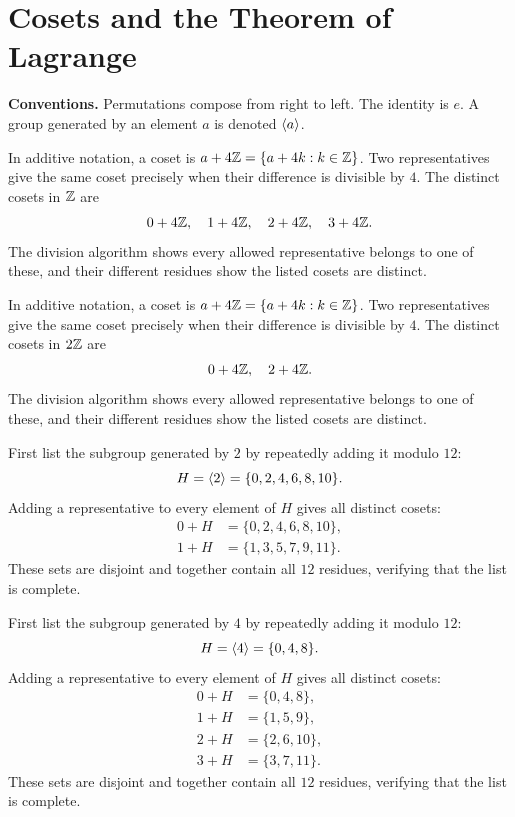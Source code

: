 \section{Cosets and the Theorem of Lagrange}
\textbf{Conventions.} Permutations compose from right to left. The identity is $e$. A group generated by an element $a$ is denoted $\langle a\rangle$.

In additive notation, a coset is $a+4\mathbb{Z}=\{a+4k:k\in\mathbb{Z}\}$. Two representatives give the same coset precisely when their difference is divisible by $4$. The distinct cosets in $\mathbb{Z}$ are\[0+4\mathbb{Z},\quad 1+4\mathbb{Z},\quad 2+4\mathbb{Z},\quad 3+4\mathbb{Z}.\]The division algorithm shows every allowed representative belongs to one of these, and their different residues show the listed cosets are distinct.

In additive notation, a coset is $a+4\mathbb{Z}=\{a+4k:k\in\mathbb{Z}\}$. Two representatives give the same coset precisely when their difference is divisible by $4$. The distinct cosets in $2\mathbb{Z}$ are\[0+4\mathbb{Z},\quad 2+4\mathbb{Z}.\]The division algorithm shows every allowed representative belongs to one of these, and their different residues show the listed cosets are distinct.

First list the subgroup generated by $2$ by repeatedly adding it modulo $12$:\[H=\langle 2\rangle=\{0,2,4,6,8,10\}.\]Adding a representative to every element of $H$ gives all distinct cosets:\[\begin{aligned}0+H&=\{0,2,4,6,8,10\},\\
1+H&=\{1,3,5,7,9,11\}.\end{aligned}\]These sets are disjoint and together contain all $12$ residues, verifying that the list is complete.

First list the subgroup generated by $4$ by repeatedly adding it modulo $12$:\[H=\langle 4\rangle=\{0,4,8\}.\]Adding a representative to every element of $H$ gives all distinct cosets:\[\begin{aligned}0+H&=\{0,4,8\},\\
1+H&=\{1,5,9\},\\
2+H&=\{2,6,10\},\\
3+H&=\{3,7,11\}.\end{aligned}\]These sets are disjoint and together contain all $12$ residues, verifying that the list is complete.

